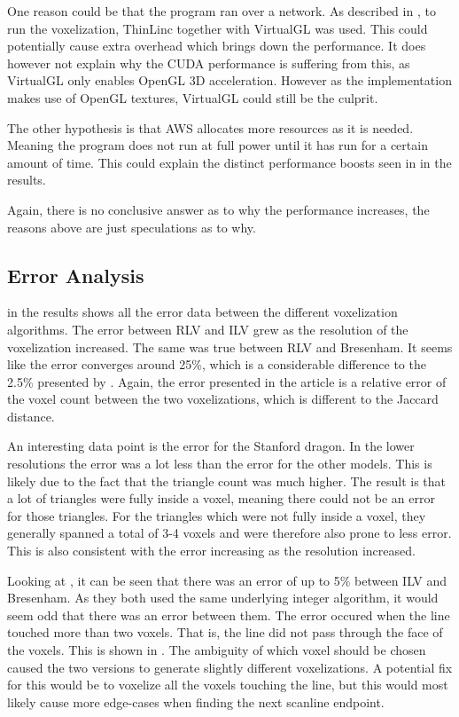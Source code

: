 One reason could be that the program ran over a network.
As described in , to run the voxelization, ThinLinc together with VirtualGL was used.
This could potentially cause extra overhead which brings down the performance. 
It does however not explain why the CUDA performance is suffering from this, as VirtualGL only enables OpenGL 3D acceleration.
However as the implementation makes use of OpenGL textures, VirtualGL could still be the culprit.

The other hypothesis is that AWS allocates more resources as it is needed. 
Meaning the program does not run at full power until it has run for a certain amount of time.
This could explain the distinct performance boosts seen in  in the results.

Again, there is no conclusive answer as to why the performance increases, the reasons above are just speculations as to why. 

\subsection{Error Analysis}
 in the results shows all the error data between the different voxelization algorithms.
The error between RLV and ILV grew as the resolution of the voxelization increased.
The same was true between RLV and Bresenham.
It seems like the error converges around 25\%, which is a considerable difference to the 2.5\% presented by .
Again, the error presented in the article is a relative error of the voxel count between the two voxelizations, which is different to the Jaccard distance.

An interesting data point is the error for the Stanford dragon.
In the lower resolutions the error was a lot less than the error for the other models.
This is likely due to the fact that the triangle count was much higher.
The result is that a lot of triangles were fully inside a voxel, meaning there could not be an error for those triangles.
For the triangles which were not fully inside a voxel, they generally spanned a total of 3-4 voxels and were therefore also prone to less error.
This is also consistent with the error increasing as the resolution increased.

Looking at , it can be seen that there was an error of up to 5\% between ILV and Bresenham.
As they both used the same underlying integer algorithm, it would seem odd that there was an error between them.
The error occured when the line touched more than two voxels.
That is, the line did not pass through the face of the voxels.
This is shown in .
The ambiguity of which voxel should be chosen caused the two versions to generate slightly different voxelizations.
A potential fix for this would be to voxelize all the voxels touching the line, but this would most likely cause more edge-cases when finding the next scanline endpoint. 

